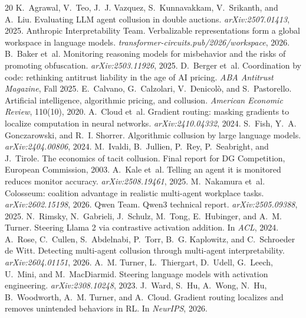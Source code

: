 \documentclass{article}
\begin{document}
\small
\setlength{\bibsep}{2pt}
\begin{thebibliography}{20}
 K.~Agrawal, V.~Teo, J.~J. Vazquez, S.~Kunnavakkam, V.~Srikanth, and A.~Liu. Evaluating LLM agent collusion in double auctions. \emph{arXiv:2507.01413}, 2025.
 Anthropic Interpretability Team. Verbalizable representations form a global workspace in language models. \emph{transformer-circuits.pub/2026/workspace}, 2026.
 B.~Baker et~al. Monitoring reasoning models for misbehavior and the risks of promoting obfuscation. \emph{arXiv:2503.11926}, 2025.
 D.~Berger et~al. Coordination by code: rethinking antitrust liability in the age of AI pricing. \emph{ABA Antitrust Magazine}, Fall 2025.
 E.~Calvano, G.~Calzolari, V.~Denicol\`o, and S.~Pastorello. Artificial intelligence, algorithmic pricing, and collusion. \emph{American Economic Review}, 110(10), 2020.
 A.~Cloud et~al. Gradient routing: masking gradients to localize computation in neural networks. \emph{arXiv:2410.04332}, 2024.
 S.~Fish, Y.~A. Gonczarowski, and R.~I. Shorrer. Algorithmic collusion by large language models. \emph{arXiv:2404.00806}, 2024.
 M.~Ivaldi, B.~Jullien, P.~Rey, P.~Seabright, and J.~Tirole. The economics of tacit collusion. Final report for DG Competition, European Commission, 2003.
 A.~Kale et~al. Telling an agent it is monitored reduces monitor accuracy. \emph{arXiv:2508.19461}, 2025.
 M.~Nakamura et~al. Colosseum: coalition advantage in realistic multi-agent workplace tasks. \emph{arXiv:2602.15198}, 2026.
 Qwen Team. Qwen3 technical report. \emph{arXiv:2505.09388}, 2025.
 N.~Rimsky, N.~Gabrieli, J.~Schulz, M.~Tong, E.~Hubinger, and A.~M. Turner. Steering Llama 2 via contrastive activation addition. In \emph{ACL}, 2024.
 A.~Rose, C.~Cullen, S.~Abdelnabi, P.~Torr, B.~G. Kaplowitz, and C.~Schroeder de Witt. Detecting multi-agent collusion through multi-agent interpretability. \emph{arXiv:2604.01151}, 2026.
 A.~M. Turner, L.~Thiergart, D.~Udell, G.~Leech, U.~Mini, and M.~MacDiarmid. Steering language models with activation engineering. \emph{arXiv:2308.10248}, 2023.
 J.~Ward, S.~Hu, A.~Wong, N.~Hu, B.~Woodworth, A.~M. Turner, and A.~Cloud. Gradient routing localizes and removes unintended behaviors in RL. In \emph{NeurIPS}, 2026.
\end{thebibliography}
\normalsize
\end{document}
